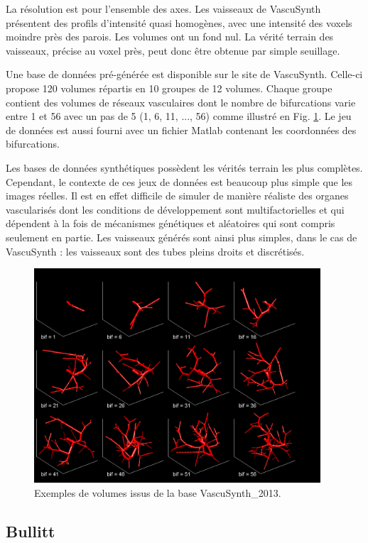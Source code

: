 La résolution est  pour l'ensemble des axes. Les vaisseaux de VascuSynth présentent des profils d'intensité quasi homogènes, avec une intensité des voxels moindre près des parois. Les volumes ont un fond nul. La vérité terrain des vaisseaux, précise au voxel près, peut donc être obtenue par simple seuillage.

Une base de données pré-générée est disponible sur le site de VascuSynth. Celle-ci propose 120 volumes répartis en 10 groupes de 12 volumes. Chaque groupe contient des volumes de réseaux vasculaires dont le nombre de bifurcations varie entre 1 et 56 avec un pas de 5 (1, 6, 11, ..., 56) comme illustré en Fig. \ref{fig:VascuSynth}. Le jeu de données est aussi fourni avec un fichier Matlab contenant les coordonnées des bifurcations.

Les bases de données synthétiques possèdent les vérités terrain les plus complètes. Cependant, le contexte de ces jeux de données est beaucoup plus simple que les images réelles. Il est en effet difficile de simuler de manière réaliste des organes vascularisés dont les conditions de développement sont multifactorielles et qui dépendent à la fois de mécanismes génétiques et aléatoires qui sont compris seulement en partie. Les vaisseaux générés sont ainsi plus simples, dans le cas de VascuSynth : les vaisseaux sont des tubes pleins droits et discrétisés.

\begin{figure}
    \centering
    \includegraphics[height=8cm]{Images/snapVascu.png}
    \caption{Exemples de volumes issus de la base VascuSynth\_2013.}
    \label{fig:VascuSynth}
\end{figure}

\subsection{Bullitt}

